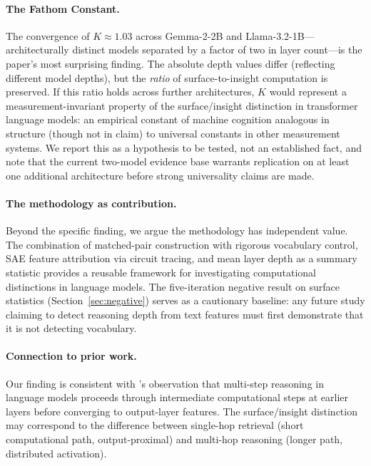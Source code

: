 \documentclass[10pt]{article}
\begin{document}
\paragraph{The Fathom Constant.}
The convergence of $K \approx 1.03$ across Gemma-2-2B and Llama-3.2-1B---architecturally distinct models separated by a factor of two in layer count---is the paper's most surprising finding. The absolute depth values differ (reflecting different model depths), but the \textit{ratio} of surface-to-insight computation is preserved. If this ratio holds across further architectures, $K$ would represent a measurement-invariant property of the surface/insight distinction in transformer language models: an empirical constant of machine cognition analogous in structure (though not in claim) to universal constants in other measurement systems. We report this as a hypothesis to be tested, not an established fact, and note that the current two-model evidence base warrants replication on at least one additional architecture before strong universality claims are made.

\paragraph{The methodology as contribution.}
Beyond the specific finding, we argue the methodology has independent value. The combination of matched-pair construction with rigorous vocabulary control, SAE feature attribution via circuit tracing, and mean layer depth as a summary statistic provides a reusable framework for investigating computational distinctions in language models. The five-iteration negative result on surface statistics (Section~\ref{sec:negative}) serves as a cautionary baseline: any future study claiming to detect reasoning depth from text features must first demonstrate that it is not detecting vocabulary.

\paragraph{Connection to prior work.}
Our finding is consistent with \citet{anthropic2025biology}'s observation that multi-step reasoning in language models proceeds through intermediate computational steps at earlier layers before converging to output-layer features. The surface/insight distinction may correspond to the difference between single-hop retrieval (short computational path, output-proximal) and multi-hop reasoning (longer path, distributed activation).
\end{document}
